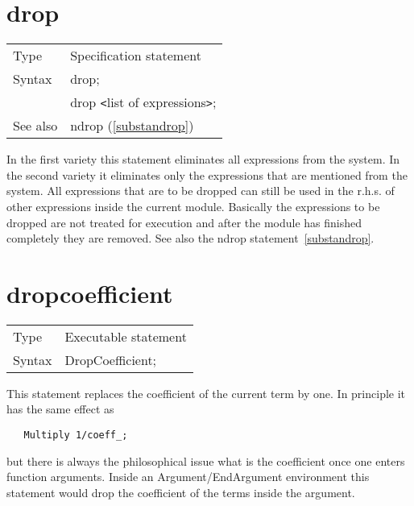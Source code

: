 
\section{drop}
\label{substadrop}

\noindent \begin{tabular}{ll}
Type & Specification statement\\
Syntax & drop; \\
       & drop {\tt<}list of expressions{\tt>};
\\ See also & ndrop (\ref{substandrop})
\end{tabular} \vspace{4mm}

\noindent In the first variety this statement eliminates all 
expressions from the system. In the second variety it 
eliminates only the expressions that are mentioned from the system. All 
expressions that are to be dropped can still be used in the r.h.s. of other 
expressions inside the current module. Basically the expressions to be 
dropped are not treated for execution and after the module has finished 
completely they are removed. See also the ndrop 
statement~\ref{substandrop}. \vspace{10mm}


\section{dropcoefficient}
\label{substadropcoefficient}

\noindent \begin{tabular}{ll}
Type & Executable statement\\
Syntax & DropCoefficient;
\end{tabular} \vspace{4mm}

\noindent This statement replaces the coefficient of the current term by 
one. In principle it has the same effect as
\begin{verbatim}
   Multiply 1/coeff_;
\end{verbatim}
but there is always the philosophical issue what is the coefficient once 
one enters function arguments. Inside an 
Argument/EndArgument environment this 
statement would drop the coefficient of the terms inside the argument.
\vspace{10mm}

